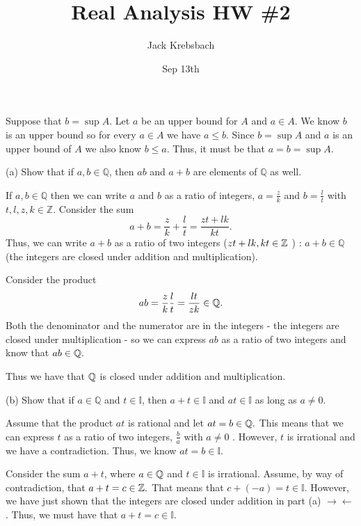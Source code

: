 \documentclass{report}
\title{Real Analysis HW \#2}
\author{Jack Krebsbach }
\date{Sep 13th}
\begin{document}
\maketitle


\begin{myproof}
Suppose that $b = \sup A$. Let $a$ be an upper bound for $A$ and $a \in A$. We know $b$ is an upper bound so for every $a \in A$ we have $a \leq b.$ Since $b = \sup A$ and $a$ is an upper bound of $A$ we also know $b \leq a$. Thus, it must be that $a = b = \sup A.$
\end{myproof}


(a) Show that if $a, b \in \mathbb{Q}$, then $a b$ and $a+b$ are elements of $\mathbb{Q}$ as well.

\sol 
If  $a, b \in \mathbb{Q}$ then we can write $a$ and $b$ as a ratio of integers, $a = \frac{z}{k}$ and $b= \frac{l}{t}$ with $t,l,z,k \in \mathbb{Z}.$ Consider the sum $$
a+b = \frac{z}{k} + \frac{l}{t}= \frac{zt + lk}{kt}. 
$$
Thus, we can write $a+b$ as a ratio of two integers ($zt+lk,kt \in \ZZ$ ) : $a+b \in \mathbb{Q}$ (the integers are closed under addition and multiplication). 
\par \bigskip

Consider the product
$$ab = \frac{z}{k} \frac{l}{t} = \frac{lt}{zk} \in \QQ.$$ Both the denominator and the numerator are in the integers - the integers are closed under multiplication - so we can express $ab$ as a ratio of two integers and know that $ab \in \QQ.$
\par 
Thus we have that $\QQ$ is  closed under addition and multiplication.
\par 
\bigskip
(b) Show that if $a \in \mathbb{Q}$ and $t \in \mathbb{I}$, then $a+t \in \mathbb{I}$ and $a t \in \mathbb{I}$ as long as $a \neq 0$.

\sol 

Assume that the product $at$ is rational and let $ at = b \in \QQ.$ This means that we can express $t$ as a ratio of two integers, $\frac{b}{a}$ with $a \neq 0$ . However, $t$ is irrational and we have a contradiction. Thus, we know $at =b  \in \mathbb{I}.$
\par
Consider the sum $a + t $, where $a \in \QQ$ and $t\in \mathbb{I}$  is irrational. Assume, by way of contradiction, that $ a + t = c \in \ZZ.$ That means that $c  + (-a) = t \in \mathbb{I}.$ However, we have just shown that the integers are closed under addition in part (a)
$\rightarrow\!\leftarrow$. Thus, we must have that $a+t = c \in \mathbb{I}.$
\end{document}

